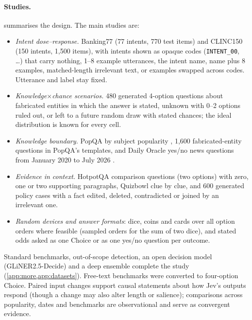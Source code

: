 \documentclass[10pt,twocolumn]{article}
\begin{document}
\paragraph{Studies.}
 summarises the design. The main studies are:
\begin{itemize}[leftmargin=*,itemsep=1pt,topsep=2pt]
\item \emph{Intent dose--response.} Banking77 \citep{casanueva2020efficient}
  (77 intents, 770 test items) and CLINC150 \citep{larson2019evaluation}
  (150 intents, 1{,}500 items), with intents shown as opaque codes
  (\texttt{INTENT\_00}, \ldots) that carry nothing, 1--8 example utterances,
  the intent name, name plus 8 examples, matched-length irrelevant text, or
  examples swapped across codes. Utterance and label stay fixed.
\item \emph{Knowledge$\times$chance scenarios.} 480 generated 4-option
  questions about fabricated entities in which the answer is stated, unknown
  with 0--2 options ruled out, or left to a future random draw with stated
  chances; the ideal distribution is known for every cell.
\item \emph{Knowledge boundary.} PopQA by subject popularity
  \citep{mallen2023popqa}, 1{,}600 fabricated-entity questions in PopQA's
  templates, and Daily Oracle yes/no news questions from January 2020 to July
  2026
  \citep{dai2025dailyoracle}.
\item \emph{Evidence in context.} HotpotQA comparison questions
  \citep{yang2018hotpotqa} (two options) with zero, one or two supporting
  paragraphs,
  Quizbowl \citep{rodriguez2019quizbowl} clue by clue, and 600 generated
  policy cases with a fact edited, deleted, contradicted or joined by an
  irrelevant one.
\item \emph{Random devices and answer formats}: dice, coins and cards over
  all option orders where feasible (sampled orders for the sum of two dice),
  and stated odds asked as one Choice or as one yes/no
  question per outcome.
\end{itemize}
Standard benchmarks, out-of-scope detection, an open decision model
(GLiNER2.5-Decide) and a deep ensemble complete the study
(\cref{app:more,app:datasets}). Free-text benchmarks were converted to
four-option Choice. Paired input changes support causal statements about how
Jev's outputs respond (though a change may also alter length or salience);
comparisons across popularity, dates and benchmarks are observational and
serve as convergent evidence.
\end{document}
